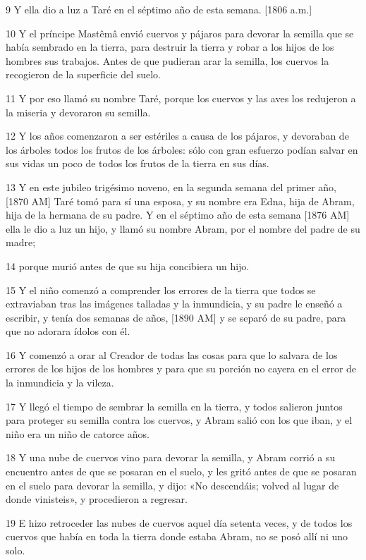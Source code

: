 \par 9 Y ella dio a luz a Taré en el séptimo año de esta semana. [1806 a.m.]
\par 10 Y el príncipe Mastêmâ envió cuervos y pájaros para devorar la semilla que se había sembrado en la tierra, para destruir la tierra y robar a los hijos de los hombres sus trabajos. Antes de que pudieran arar la semilla, los cuervos la recogieron de la superficie del suelo.
\par 11 Y por eso llamó su nombre Taré, porque los cuervos y las aves los redujeron a la miseria y devoraron su semilla.
\par 12 Y los años comenzaron a ser estériles a causa de los pájaros, y devoraban de los árboles todos los frutos de los árboles: sólo con gran esfuerzo podían salvar en sus vidas un poco de todos los frutos de la tierra en sus días.
\par 13 Y en este jubileo trigésimo noveno, en la segunda semana del primer año, [1870 AM] Taré tomó para sí una esposa, y su nombre era Edna, hija de Abram, hija de la hermana de su padre. Y en el séptimo año de esta semana [1876 AM] ella le dio a luz un hijo, y llamó su nombre Abram, por el nombre del padre de su madre;
\par 14 porque murió antes de que su hija concibiera un hijo.
\par 15 Y el niño comenzó a comprender los errores de la tierra que todos se extraviaban tras las imágenes talladas y la inmundicia, y su padre le enseñó a escribir, y tenía dos semanas de años, [1890 AM] y se separó de su padre, para que no adorara ídolos con él.
\par 16 Y comenzó a orar al Creador de todas las cosas para que lo salvara de los errores de los hijos de los hombres y para que su porción no cayera en el error de la inmundicia y la vileza.
\par 17 Y llegó el tiempo de sembrar la semilla en la tierra, y todos salieron juntos para proteger su semilla contra los cuervos, y Abram salió con los que iban, y el niño era un niño de catorce años.
\par 18 Y una nube de cuervos vino para devorar la semilla, y Abram corrió a su encuentro antes de que se posaran en el suelo, y les gritó antes de que se posaran en el suelo para devorar la semilla, y dijo: «No descendáis; volved al lugar de donde vinisteis», y procedieron a regresar.
\par 19 E hizo retroceder las nubes de cuervos aquel día setenta veces, y de todos los cuervos que había en toda la tierra donde estaba Abram, no se posó allí ni uno solo.
